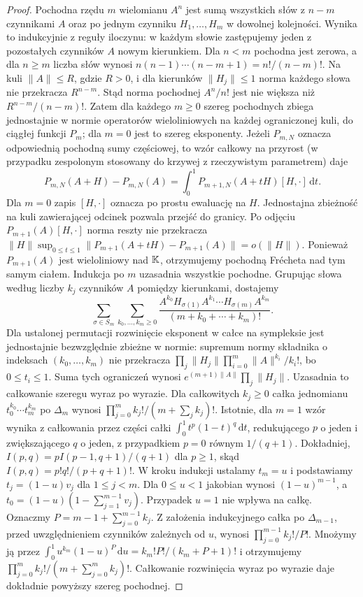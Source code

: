 \begin{proof}
Pochodna rzędu $m$ wielomianu $A^n$ jest sumą wszystkich
słów z $n-m$ czynnikami $A$ oraz po jednym czynniku
$H_1,\ldots,H_m$ w dowolnej kolejności. Wynika to
indukcyjnie z reguły iloczynu: w każdym słowie zastępujemy
jeden z pozostałych czynników $A$ nowym kierunkiem.
Dla $n<m$ pochodna jest zerowa, a dla $n\ge m$ liczba słów wynosi $n(n-1)\cdots(n-m+1)=n!/(n-m)!$. Na kuli $\|A\|\le R$, gdzie $R>0$, i dla kierunków $\|H_j\|\le1$ norma każdego słowa nie przekracza $R^{n-m}$. Stąd norma pochodnej $A^n/n!$ jest nie większa niż $R^{n-m}/(n-m)!$.
Zatem dla każdego $m\ge0$ szereg pochodnych zbiega jednostajnie w normie operatorów wieloliniowych na każdej ograniczonej kuli, do ciągłej funkcji $P_m$; dla $m=0$ jest to szereg eksponenty. Jeżeli $P_{m,N}$ oznacza odpowiednią pochodną sumy częściowej, to wzór całkowy na przyrost (w przypadku zespolonym stosowany do krzywej z rzeczywistym parametrem) daje
\[
 P_{m,N}(A+H)-P_{m,N}(A)=\int_0^1 P_{m+1,N}(A+tH)[H,\cdot]\,\mathrm dt .
\]
Dla $m=0$ zapis $[H,\cdot]$ oznacza po prostu ewaluację na $H$. Jednostajna zbieżność na kuli zawierającej odcinek pozwala przejść do granicy. Po odjęciu $P_{m+1}(A)[H,\cdot]$ norma reszty nie przekracza $\|H\|\sup_{0\le t\le1}\|P_{m+1}(A+tH)-P_{m+1}(A)\|=o(\|H\|)$. Ponieważ $P_{m+1}(A)$ jest wieloliniowy nad $\mathbb K$, otrzymujemy pochodną Frécheta nad tym samym ciałem. Indukcja po $m$ uzasadnia wszystkie pochodne.
Grupując słowa według liczby $k_j$ czynników $A$
pomiędzy kierunkami, dostajemy
\[
 \sum_{\sigma\in S_m}\sum_{k_0,\ldots,k_m\ge0}
 \frac{A^{k_0}H_{\sigma(1)}A^{k_1}\cdots H_{\sigma(m)}A^{k_m}}
 {(m+k_0+\cdots+k_m)!}.
\]
Dla ustalonej permutacji rozwinięcie eksponent w całce na sympleksie jest jednostajnie bezwzględnie zbieżne w normie: supremum normy składnika o indeksach $(k_0,\ldots,k_m)$ nie przekracza $\prod_j\|H_j\|\prod_{i=0}^m\|A\|^{k_i}/k_i!$, bo $0\le t_i\le1$. Suma tych ograniczeń wynosi $e^{(m+1)\|A\|}\prod_j\|H_j\|$. Uzasadnia to całkowanie szeregu wyraz po wyrazie.
Dla całkowitych $k_j\ge0$ całka jednomianu
$t_0^{k_0}\cdots t_m^{k_m}$ po $\Delta_m$ wynosi
$\prod_{j=0}^m k_j!/(m+\sum_j k_j)!$.
Istotnie, dla $m=1$ wzór wynika z całkowania przez
części całki $\int_0^1 t^p(1-t)^q\,\mathrm dt$,
redukującego $p$ o jeden i zwiększającego $q$ o jeden,
z przypadkiem $p=0$ równym $1/(q+1)$. Dokładniej,
$I(p,q)=pI(p-1,q+1)/(q+1)$ dla $p\ge1$, skąd
$I(p,q)=p!q!/(p+q+1)!$.
W kroku indukcji ustalamy $t_m=u$ i podstawiamy
$t_j=(1-u)v_j$ dla $1\le j<m$. Dla $0\le u<1$
jakobian wynosi $(1-u)^{m-1}$, a $t_0=(1-u)(1-\sum_{j=1}^{m-1}v_j)$.
Przypadek $u=1$ nie wpływa na całkę. Oznaczmy
$P=m-1+\sum_{j=0}^{m-1}k_j$.
Z założenia indukcyjnego całka po $\Delta_{m-1}$,
przed uwzględnieniem czynników zależnych od $u$,
wynosi $\prod_{j=0}^{m-1}k_j!/P!$.
Mnożymy ją przez $\int_0^1u^{k_m}(1-u)^P\,\mathrm du
=k_m!P!/(k_m+P+1)!$ i otrzymujemy
$\prod_{j=0}^{m}k_j!/(m+\sum_{j=0}^m k_j)!$.
Całkowanie rozwinięcia wyraz po wyrazie daje dokładnie
powyższy szereg pochodnej.
\end{proof}

